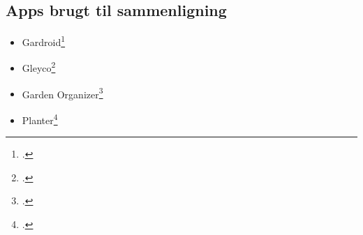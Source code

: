 \subsection{Apps brugt til sammenligning}
\label{other-apps}

\begin{itemize}
    \item Gardroid\footcite{gardroid}
    \item Gleyco\footcite{gleyco}
    \item Garden Organizer\footcite{garden-organizer}
    \item Planter\footcite{planter}
\end{itemize}

